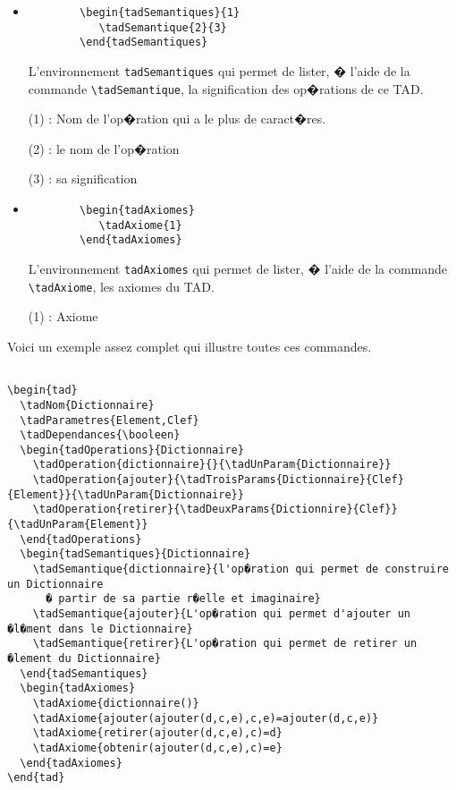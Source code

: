 \documentclass[a4paper,12pt]{report}
\begin{document}
{\begin{itemize}
 (4) : Le produit cart�sien des types en sortie, qui s'utilise de la m�me mani�re que le produit cart�sien des types en entr�e

  \item
    \begin{lstlisting}
        \begin{tadSemantiques}{1}
           \tadSemantique{2}{3}
        \end{tadSemantiques}
    \end{lstlisting}
   L'environnement \texttt{tadSemantiques} qui permet de lister, � l'aide de la commande \texttt{\textbackslash tadSemantique}, la signification des op�rations de ce TAD. 


 (1) : Nom de l'op�ration qui a le  plus de caract�res. 


 (2) : le nom de l'op�ration


 (3) : sa signification
  

  \item
    \begin{lstlisting}
        \begin{tadAxiomes}
           \tadAxiome{1}
        \end{tadAxiomes}
    \end{lstlisting}
   L'environnement \texttt{tadAxiomes} qui permet de lister, � l'aide de la commande \texttt{\textbackslash tadAxiome}, les axiomes du TAD. 

 (1) : Axiome 

\end{itemize}


Voici un exemple assez complet qui illustre toutes ces commandes.

\begin{lstlisting}
  
\begin{tad}
  \tadNom{Dictionnaire}
  \tadParametres{Element,Clef}
  \tadDependances{\booleen}
  \begin{tadOperations}{Dictionnaire}
    \tadOperation{dictionnaire}{}{\tadUnParam{Dictionnaire}}
    \tadOperation{ajouter}{\tadTroisParams{Dictionnaire}{Clef}{Element}}{\tadUnParam{Dictionnaire}}
    \tadOperation{retirer}{\tadDeuxParams{Dictionnire}{Clef}}{\tadUnParam{Element}}
  \end{tadOperations}
  \begin{tadSemantiques}{Dictionnaire}
    \tadSemantique{dictionnaire}{l'op�ration qui permet de construire un Dictionnaire
      � partir de sa partie r�elle et imaginaire}
    \tadSemantique{ajouter}{L'op�ration qui permet d'ajouter un �l�ment dans le Dictionnaire}
    \tadSemantique{retirer}{L'op�ration qui permet de retirer un �lement du Dictionnaire}
  \end{tadSemantiques}
  \begin{tadAxiomes}
    \tadAxiome{dictionnaire()}
    \tadAxiome{ajouter(ajouter(d,c,e),c,e)=ajouter(d,c,e)}
    \tadAxiome{retirer(ajouter(d,c,e),c)=d}
    \tadAxiome{obtenir(ajouter(d,c,e),c)=e}
  \end{tadAxiomes}
\end{tad}
\end{lstlisting}

}
\end{document}
